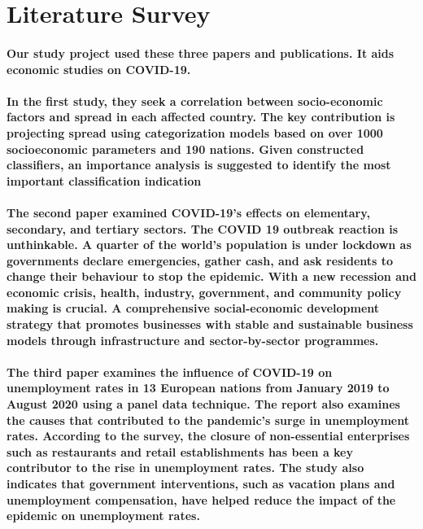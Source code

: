\documentclass{article}
\begin{document}
\section{Literature Survey}
    
\paragraph{ Our study project used these three papers and publications.
It aids economic studies on COVID-19.} 
    
\paragraph{ In the first study, they seek a correlation between socio-economic 
factors and spread in each affected country. The key
contribution is projecting spread using categorization models
based on over 1000 socioeconomic parameters and 190 nations. Given constructed 
classifiers, an importance analysis is 
suggested to identify the most important classification indication}

\paragraph{ The second paper examined COVID-19’s effects on elementary, secondary, and tertiary sectors. The COVID 19 outbreak
reaction is unthinkable. A quarter of the world’s population is
under lockdown as governments declare emergencies, gather
cash, and ask residents to change their behaviour to stop
the epidemic. With a new recession and economic crisis,
health, industry, government, and community policy making
is crucial. A comprehensive social-economic development
strategy that promotes businesses with stable and sustainable
business models through infrastructure and sector-by-sector
programmes.}

\paragraph{The third paper examines the influence of COVID-19 on unemployment rates in 13 European nations from January 2019 to August 2020 using a panel data technique. The report also examines the causes that contributed to the pandemic's surge in unemployment rates. According to the survey, the closure of non-essential enterprises such as restaurants and retail establishments has been a key contributor to the rise in unemployment rates. The study also indicates that government interventions, such as vacation plans and unemployment compensation, have helped reduce the impact of the epidemic on unemployment rates.}
\end{document}
